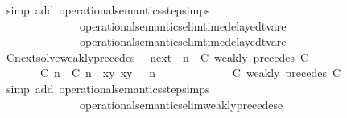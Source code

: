 \begin{isabellebody}
\isamarkupfalse%
\ {\isacharparenleft}simp\ add{\isacharcolon}\ operational{\isacharunderscore}semantics{\isacharunderscore}step{\isachardot}simps\isanewline
\ \ \ \ \ \ \ \ \ \ \ \ \ \ operational{\isacharunderscore}semantics{\isacharunderscore}elim{\isachardot}timedelayed{\isacharunderscore}tvar{\isacharunderscore}e{}\isanewline
\ \ \ \ \ \ \ \ \ \ \ \ \ \ operational{\isacharunderscore}semantics{\isacharunderscore}elim{\isachardot}timedelayed{\isacharunderscore}tvar{\isacharunderscore}e{}{\isacharparenright}%
\endisatagproof
{\isafoldproof}%
%
\isadelimproof
\isanewline
%
\endisadelimproof
\isanewline
{}\isamarkupfalse%
\ Cnext{\isacharunderscore}solve{\isacharunderscore}weakly{\isacharunderscore}precedes{\isacharcolon}\isanewline
\ \ {\isacartoucheopen}{\isacharparenleft}{\isasymC}\isactrlsub n\isactrlsub e\isactrlsub x\isactrlsub t\ {\isacharparenleft}{\isasymGamma}{\isacharcomma}\ n\ {\isasymturnstile}\ {\isacharparenleft}{\isacharparenleft}C\ weakly\ precedes\ C\ {\isacharhash}\ {\isasymPsi}{\isacharparenright}\ {\isasymtriangleright}\ {\isasymPhi}{\isacharparenright}{\isacharparenright}\isanewline
\ \ \ \ {\isasymsupseteq}\ {\isacharbraceleft}\ {\isacharparenleft}{\isacharparenleft}{\isasymlceil}{\isacharhash}\isactrlsup {\isasymle}\ C\ n{\isacharcomma}\ {\isacharhash}\isactrlsup {\isasymle}\ C\ n{\isasymrceil}\ {\isasymin}\ {\isacharparenleft}{\isasymlambda}{\isacharparenleft}x{\isacharcomma}y{\isacharparenright}{\isachardot}\ x{\isasymle}y{\isacharparenright}{\isacharparenright}\ {\isacharhash}\ {\isasymGamma}{\isacharparenright}{\isacharcomma}\ n\isanewline
\ \ \ \ \ \ \ \ \ \ {\isasymturnstile}\ {\isasymPsi}\ {\isasymtriangleright}\ {\isacharparenleft}{\isacharparenleft}C\ weakly\ precedes\ C\ {\isacharhash}\ {\isasymPhi}{\isacharparenright}\ {\isacharbraceright}{\isacartoucheclose}\isanewline
%
\isadelimproof
%
\endisadelimproof
%
\isatagproof
{}\isamarkupfalse%
\ {\isacharparenleft}simp\ add{\isacharcolon}\ operational{\isacharunderscore}semantics{\isacharunderscore}step{\isachardot}simps\isanewline
\ \ \ \ \ \ \ \ \ \ \ \ \ \ operational{\isacharunderscore}semantics{\isacharunderscore}elim{\isachardot}weakly{\isacharunderscore}precedes{\isacharunderscore}e{\isacharparenright}%
\endisatagproof
{\isafoldproof}%
%
\isadelimproof
\isanewline
%
\endisadelimproof
\isanewline
{}\isamarkupfalse%

\end{isabellebody}
